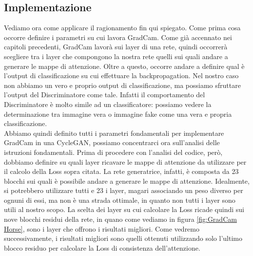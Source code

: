 \subsection{Implementazione}
Vediamo ora come applicare il ragionamento fin qui spiegato. Come prima cosa occorre definire i parametri su cui lavora GradCam. Come già accennato nei capitoli precedenti, GradCam lavorà sui layer di una rete, quindi occorrerà scegliere tra i layer che compongono la nostra rete quelli sui quali andare a generare le mappe di attenzione. Oltre a questo, occorre andare a definire qual è l'output di classificazione su cui effettuare la backpropagation. Nel nostro caso non abbiamo un vero e proprio output di classificazione, ma possiamo sfruttare l'output del Discriminatore come tale. Infatti il comportamento del Discriminatore è molto simile ad un classificatore: possiamo vedere la determinazione tra immagine vera o immagine fake come una vera e propria classificazione. 
\\Abbiamo quindi definito tutti i parametri fondamentali per implementare GradCam in una CycleGAN, possiamo concentrarci ora sull'analisi delle istruzioni fondamentali.
Prima di procedere con l'analisi del codice, però, dobbiamo definire su quali layer ricavare le mappe di attenzione da utilizzare per il calcolo della Loss sopra citata. La rete generatrice, infatti, è composta da 23 blocchi sui quali è possibile andare a generare le mappe di attenzione. Idealmente, si potrebbero utilizzare tutti e 23 i layer, magari associando un peso diverso per ognuni di essi, ma non è una strada ottimale, in quanto non tutti i layer sono utili al nostro scopo. La scelta dei layer su cui calcolare la Loss ricade quindi sui nove blocchi residui della rete, in quano come vediamo in figura \ref{fig:GradCam Horse},  sono i layer che offrono i risultati migliori. Come vedremo successivamente, i risultati migliori sono quelli ottenuti utilizzando solo l'ultimo blocco residuo per calcolare la Loss di consistenza dell'attenzione. 

